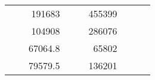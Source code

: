 \begin{table}[H]
\begin{tabular}{|ccrccrccc}
\multicolumn{1}{|c|}{\cellcolor[HTML]{FFFFC7}}                                & \multicolumn{1}{c|}{\cellcolor[HTML]{DDFDFF}}                      & \multicolumn{1}{r|}{\cellcolor[HTML]{DAE8FC}191683}    & \multicolumn{1}{c|}{\cellcolor[HTML]{FFFFC7}}                                & \multicolumn{1}{c|}{\cellcolor[HTML]{DDFDFF}}                       & \multicolumn{1}{r|}{\cellcolor[HTML]{DDFDFF}455399}    &                                                                              &                                                                    &                                                        \\ \cline{3-3} \cline{6-6}
\multicolumn{1}{|c|}{\cellcolor[HTML]{FFFFC7}}                                & \multicolumn{1}{c|}{\cellcolor[HTML]{DDFDFF}}                      & \multicolumn{1}{r|}{\cellcolor[HTML]{DDFDFF}104908}    & \multicolumn{1}{c|}{\cellcolor[HTML]{FFFFC7}}                                & \multicolumn{1}{c|}{\cellcolor[HTML]{DDFDFF}}                       & \multicolumn{1}{r|}{\cellcolor[HTML]{DAE8FC}286076}    &                                                                              &                                                                    &                                                        \\ \cline{3-3} \cline{6-6}
\multicolumn{1}{|c|}{\cellcolor[HTML]{FFFFC7}}                                & \multicolumn{1}{c|}{\cellcolor[HTML]{DDFDFF}}                      & \multicolumn{1}{r|}{\cellcolor[HTML]{DAE8FC}67064.8}   & \multicolumn{1}{c|}{\cellcolor[HTML]{FFFFC7}}                                & \multicolumn{1}{c|}{\cellcolor[HTML]{DDFDFF}}                       & \multicolumn{1}{r|}{\cellcolor[HTML]{DDFDFF}65802}     &                                                                              &                                                                    &                                                        \\ \cline{3-3} \cline{6-6}
\multicolumn{1}{|c|}{\cellcolor[HTML]{FFFFC7}}                                & \multicolumn{1}{c|}{\cellcolor[HTML]{DDFDFF}}                      & \multicolumn{1}{r|}{\cellcolor[HTML]{DDFDFF}79579.5}   & \multicolumn{1}{c|}{\cellcolor[HTML]{FFFFC7}}                                & \multicolumn{1}{c|}{\cellcolor[HTML]{DDFDFF}}                       & \multicolumn{1}{r|}{\cellcolor[HTML]{DAE8FC}136201}    &                                                                              &                                                                    &                                                        \\ \cline{3-3} \cline{6-6}

\end{tabular}
\end{table}
